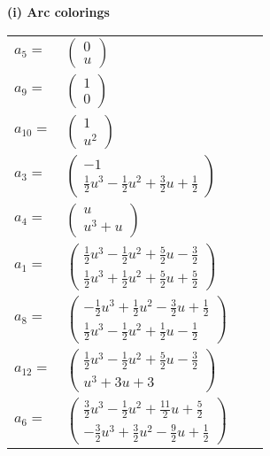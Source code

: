 \documentclass[1p]{elsarticle_modified}
\theoremstyle{definition}
\begin{document}
\flushleft \textbf{(i) Arc colorings}\\
\begin{tabular}{m{7pt} m{180pt} m{7pt} m{180pt} }
\flushright $a_{5}=$&$\begin{pmatrix}0\\u\end{pmatrix}$ \\
\flushright $a_{9}=$&$\begin{pmatrix}1\\0\end{pmatrix}$ \\
\flushright $a_{10}=$&$\begin{pmatrix}1\\u^2\end{pmatrix}$ \\
\flushright $a_{3}=$&$\begin{pmatrix}-1\\\frac{1}{2} u^3-\frac{1}{2} u^2+\frac{3}{2} u+\frac{1}{2}\end{pmatrix}$ \\
\flushright $a_{4}=$&$\begin{pmatrix}u\\u^3+u\end{pmatrix}$ \\
\flushright $a_{1}=$&$\begin{pmatrix}\frac{1}{2} u^3-\frac{1}{2} u^2+\frac{5}{2} u-\frac{3}{2}\\\frac{1}{2} u^3+\frac{1}{2} u^2+\frac{5}{2} u+\frac{5}{2}\end{pmatrix}$ \\
\flushright $a_{8}=$&$\begin{pmatrix}-\frac{1}{2} u^3+\frac{1}{2} u^2-\frac{3}{2} u+\frac{1}{2}\\\frac{1}{2} u^3-\frac{1}{2} u^2+\frac{1}{2} u-\frac{1}{2}\end{pmatrix}$ \\
\flushright $a_{12}=$&$\begin{pmatrix}\frac{1}{2} u^3-\frac{1}{2} u^2+\frac{5}{2} u-\frac{3}{2}\\u^3+3 u+3\end{pmatrix}$ \\
\flushright $a_{6}=$&$\begin{pmatrix}\frac{3}{2} u^3-\frac{1}{2} u^2+\frac{11}{2} u+\frac{5}{2}\\-\frac{3}{2} u^3+\frac{3}{2} u^2-\frac{9}{2} u+\frac{1}{2}\end{pmatrix}$ \\

\end{tabular}
\end{document}
